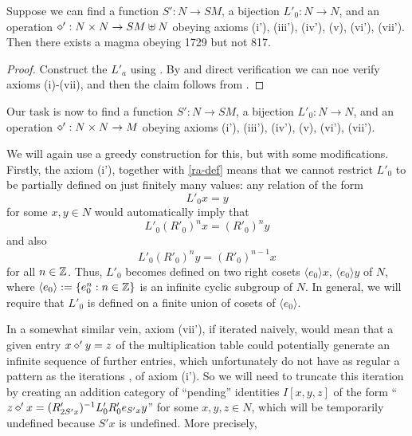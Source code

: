 \begin{lemma}\label{axiom-reduce}\label{Eq1729.reduce_to_new_axioms}\leanok  Suppose we can find a function $S': N \to SM$, a bijection $L'_0: N \to N$, and an operation $\diamond': N \times N \to SM \uplus N$ obeying axioms (i'), (iii'), (iv'), (v), (vi'), (vii').  Then there exists a magma obeying 1729 but not 817.
\end{lemma}

\begin{proof}  Construct the $L'_a$ using .  By  and direct verification we can noe verify axioms (i)-(vii), and then the claim follows from .
\end{proof}

Our task is now to find a function $S': N \to SM$, a bijection $L'_0: N \to N$, and an operation $\diamond': N \times N \to M$ obeying axioms (i'), (iii'), (iv'), (v), (vi'), (vii').

We will again use a greedy construction for this, but with some modifications.  Firstly, the axiom (i'), together with \eqref{ra-def} means that we cannot restrict $L'_0$ to be partially defined on just finitely many values: any relation of the form
$$ L'_0 x = y$$
for some $x,y \in N$ would automatically imply that
\begin{equation}\label{itero}
 L'_0 (R'_0)^n x = (R'_0)^n y
\end{equation}
and also
\begin{equation}\label{itero-2}
  L'_0 (R'_0)^n y = (R'_0)^{n-1} x
\end{equation}
for all $n \in \mathbb{Z}$.  Thus, $L'_0$ becomes defined on two right cosets $\langle e_0 \rangle x$, $\langle e_0 \rangle y$ of $N$, where $\langle e_0 \rangle := \{ e_0^n: n \in \mathbb{Z}\}$ is an infinite cyclic subgroup of $N$.  In general, we will require that $L'_0$ is defined on a finite union of cosets of $\langle e_0\rangle$.

In a somewhat similar vein, axiom (vii'), if iterated naively, would mean that a given entry $x \diamond' y = z$ of the multiplication table could potentially generate an infinite sequence of further entries, which unfortunately do not have as regular a pattern as the iterations ,  of axiom (i').  So we will need to truncate this iteration by creating an addition category of ``pending'' identities $I[x,y,z]$ of the form ``$z \diamond' x = (R'_{2S'x})^{-1} L'_0 R'_0 e_{S'x} y$'' for some $x,y,z \in N$, which will be temporarily undefined because $S'x$ is undefined. More precisely,

